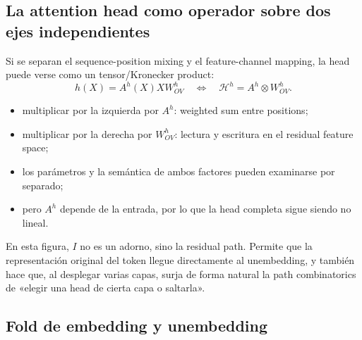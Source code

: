 

\subsection{La attention head como operador sobre dos ejes independientes}

Si se separan el sequence-position mixing y el feature-channel mapping, la head puede verse como un tensor/Kronecker product:
\[
h(X)=A^h(X)XW_{OV}^h
\quad\Longleftrightarrow\quad
\mathcal{H}^h=A^h\otimes W_{OV}^h.
\]

\begin{itemize}
  \item multiplicar por la izquierda por $A^h$: weighted sum entre positions;
  \item multiplicar por la derecha por $W_{OV}^h$: lectura y escritura en el residual feature space;
  \item los parámetros y la semántica de ambos factores pueden examinarse por separado;
  \item pero $A^h$ depende de la entrada, por lo que la head completa sigue siendo no lineal.
\end{itemize}



En esta figura, $I$ no es un adorno, sino la residual path. Permite que la representación original del token llegue directamente al unembedding, y también hace que, al desplegar varias capas, surja de forma natural la path combinatorics de «elegir una head de cierta capa o saltarla».

\subsection{Fold de embedding y unembedding}

